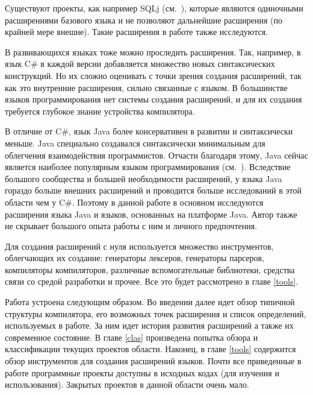 \documentclass[a4paper,12pt,titlepage]{extarticle}
\begin{document}
Существуют проекты, как например SQLj (см.~\cite{sqlj}), которые являются
одиночными расширениями базового языка и не позволяют дальнейшие расширения (по
крайней мере внешне). Такие расширения в работе также исследуются.

В развивающихся языках тоже можно проследить расширения. Так, например, в язык
C\# в каждой версии добавляется множество новых синтаксических конструкций. Но
их сложно оценивать с точки зрения создания расширений, так как это внутренние
расширения, сильно связанные с языком. В большинстве языков программирования
нет системы создания расширений, и для их создания требуется глубокое знание
устройства компилятора.

В отличие от C\#, язык Java более консервативен в развитии и синтаксически
меньше. Java специально создавался синтаксически минимальным для облегчения
взаимодействия программистов. Отчасти благодаря этому, Java сейчас
является наиболее популярным языком программирования (см.~\cite{tiobe}).
Вследствие большого сообщества и большей необходимости расширений, у языка Java
гораздо больше внешних расширений и проводится больше исследований в этой
области чем у C\#. Поэтому в данной работе в основном
исследуются расширения языка Java и языков, основанных на платформе Java. Автор
также не скрывает большого опыта работы с ним и личного предпочтения.

Для создания расширений с нуля используется множество инструментов, облегчающих
их создание: генераторы лексеров, генераторы парсеров, компиляторы
компиляторов, различные вспомогательные библиотеки, средства связи со средой
разработки и прочее. Все это будет рассмотрено в главе \ref{tools}.

Работа устроена следующим образом. Во введении далее идет обзор типичной
структуры компилятора, его возможных точек расширения и список определений,
используемых в работе. За ним идет история развития расширений а также
их современное состояние. В главе \ref{clas} произведена попытка обзора и
классификации текущих проектов области. Наконец, в главе \ref{tools} содержится
обзор инструментов для создания расширений языков. Почти все приведенные в
работе программные проекты доступны в исходных кодах (для изучения и
использования). Закрытых проектов в данной области очень мало.

\pagebreak[4]
\end{document}
